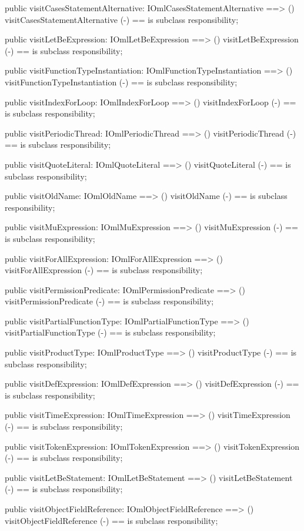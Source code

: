 \begin{vdm_al}
  public visitCasesStatementAlternative: IOmlCasesStatementAlternative ==> ()
  visitCasesStatementAlternative (-) == is subclass responsibility;

  public visitLetBeExpression: IOmlLetBeExpression ==> ()
  visitLetBeExpression (-) == is subclass responsibility;

  public visitFunctionTypeInstantiation: IOmlFunctionTypeInstantiation ==> ()
  visitFunctionTypeInstantiation (-) == is subclass responsibility;

  public visitIndexForLoop: IOmlIndexForLoop ==> ()
  visitIndexForLoop (-) == is subclass responsibility;

  public visitPeriodicThread: IOmlPeriodicThread ==> ()
  visitPeriodicThread (-) == is subclass responsibility;

  public visitQuoteLiteral: IOmlQuoteLiteral ==> ()
  visitQuoteLiteral (-) == is subclass responsibility;

  public visitOldName: IOmlOldName ==> ()
  visitOldName (-) == is subclass responsibility;

  public visitMuExpression: IOmlMuExpression ==> ()
  visitMuExpression (-) == is subclass responsibility;

  public visitForAllExpression: IOmlForAllExpression ==> ()
  visitForAllExpression (-) == is subclass responsibility;

  public visitPermissionPredicate: IOmlPermissionPredicate ==> ()
  visitPermissionPredicate (-) == is subclass responsibility;

  public visitPartialFunctionType: IOmlPartialFunctionType ==> ()
  visitPartialFunctionType (-) == is subclass responsibility;

  public visitProductType: IOmlProductType ==> ()
  visitProductType (-) == is subclass responsibility;

  public visitDefExpression: IOmlDefExpression ==> ()
  visitDefExpression (-) == is subclass responsibility;

  public visitTimeExpression: IOmlTimeExpression ==> ()
  visitTimeExpression (-) == is subclass responsibility;

  public visitTokenExpression: IOmlTokenExpression ==> ()
  visitTokenExpression (-) == is subclass responsibility;

  public visitLetBeStatement: IOmlLetBeStatement ==> ()
  visitLetBeStatement (-) == is subclass responsibility;

  public visitObjectFieldReference: IOmlObjectFieldReference ==> ()
  visitObjectFieldReference (-) == is subclass responsibility;


\end{vdm_al}
